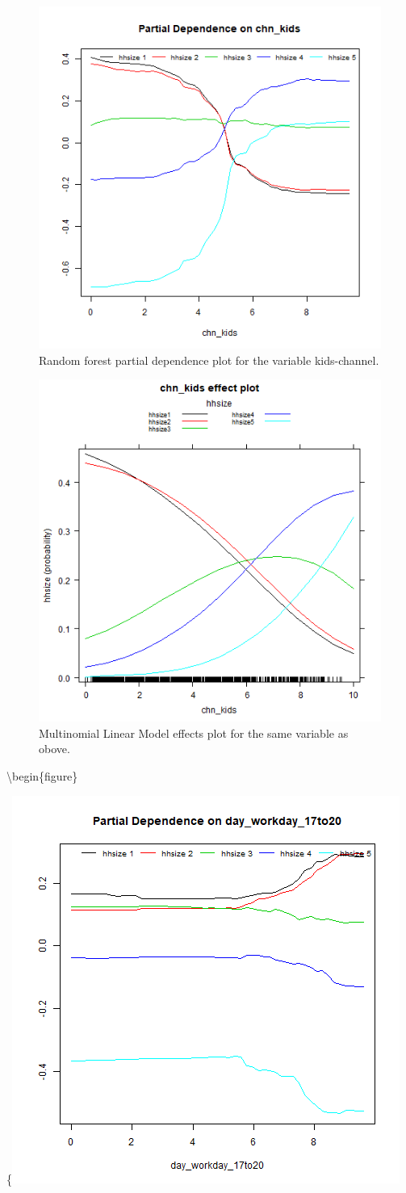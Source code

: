 \documentclass[]{article}
\begin{document}
\pagebreak

\begin{figure}

{\centering \includegraphics[width=0.55\linewidth]{../data/partialplot.rf.chn_kids} 

}

\caption{\label{fig:fig11} Random forest partial dependence plot for the variable kids-channel.}\label{fig:unnamed-chunk-31}
\end{figure}

\begin{figure}

{\centering \includegraphics[width=0.55\linewidth]{../data/partialplot.mnr.chn_kids} 

}

\caption{\label{fig:fig12} Multinomial Linear Model effects plot for the same variable as obove.}\label{fig:unnamed-chunk-32}
\end{figure}

\pagebreak

\textbackslash{}begin\{figure\}

\{\centering \includegraphics[width=0.55\linewidth]{../data/partialplot.rf.day_workday_17to20}
\end{document}
